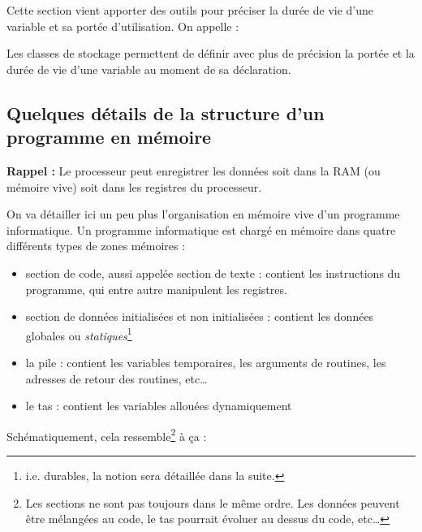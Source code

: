 \documentclass[../../../main.tex]{subfiles}
\begin{document}
Cette section vient apporter des outils pour préciser la durée de vie d'une variable et sa portée d'utilisation. On appelle : 


Les classes de stockage permettent de définir avec plus de précision la portée et la durée de vie d'une variable au moment de sa déclaration.
\subsection{Quelques détails de la structure d'un programme en mémoire}
\textbf{Rappel :} Le processeur peut enregistrer les données soit dans la RAM (ou mémoire vive) soit dans les registres du processeur.

On va détailler ici un peu plus l'organisation en mémoire vive d'un programme informatique. Un programme informatique est chargé en mémoire dans quatre différents types de zones mémoires :
\begin{itemize}
	\item section de code, aussi appelée section de texte : contient les instructions du programme, qui entre autre manipulent les registres.
	\item section de données initialisées et non initialisées : contient les données globales ou \textit{statiques}\footnote{i.e. durables, la notion sera détaillée dans la suite.}
	\item la pile : contient les variables temporaires, les arguments de routines, les adresses de retour des routines, etc\dots
	\item le tas : contient les variables allouées dynamiquement
\end{itemize}
Schématiquement, cela ressemble\footnote{Les sections ne sont pas toujours dans le même ordre. Les données peuvent être mélangées au code, le tas pourrait évoluer au dessus du code, etc\dots} à ça :
\end{document}
